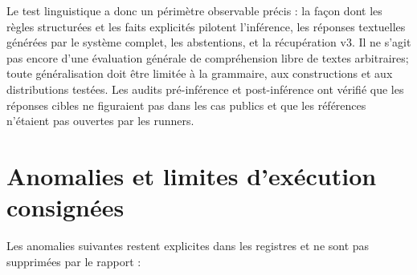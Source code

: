 \documentclass[11pt,a4paper]{article}
\begin{document}
Le test linguistique a donc un périmètre observable précis : la façon dont les règles structurées et les faits explicités pilotent l’inférence, les réponses textuelles générées par le système complet, les abstentions, et la récupération v3. Il ne s’agit pas encore d’une évaluation générale de compréhension libre de textes arbitraires; toute généralisation doit être limitée à la grammaire, aux constructions et aux distributions testées. Les audits pré-inférence et post-inférence ont vérifié que les réponses cibles ne figuraient pas dans les cas publics et que les références n’étaient pas ouvertes par les runners.

\section{Anomalies et limites d’exécution consignées}
Les anomalies suivantes restent explicites dans les registres et ne sont pas supprimées par le rapport :
\end{document}

